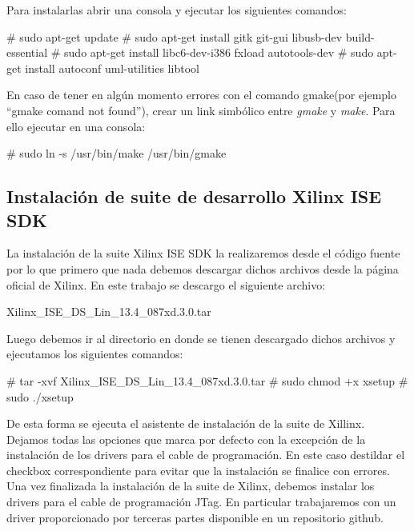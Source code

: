Para instalarlas abrir una consola y ejecutar los siguientes comandos:\\

\begin{bash}
# sudo apt-get update
# sudo apt-get install gitk git-gui libusb-dev build-essential 
# sudo apt-get install libc6-dev-i386 fxload autotools-dev
# sudo apt-get install autoconf uml-utilities libtool
\end{bash}

En caso de tener en algún momento errores con el comando gmake(por ejemplo “gmake comand not found”), crear un link simbólico entre \textit{gmake} y \textit{make}. Para ello ejecutar en una consola:\\

\begin{bash}
# sudo ln -s /usr/bin/make /usr/bin/gmake
\end{bash}

\subsection{Instalación de suite de desarrollo Xilinx ISE SDK}

La instalación de la suite Xilinx ISE SDK la realizaremos desde el código fuente por lo que primero que nada debemos descargar dichos archivos desde la página oficial de Xilinx. En este trabajo se descargo el siguiente archivo:

\begin{center}
Xilinx\_ISE\_DS\_Lin\_13.4\_087xd.3.0.tar
\end{center}

Luego debemos ir al directorio en donde se tienen descargado dichos archivos y ejecutamos los siguientes comandos:

\begin{bash}
# tar -xvf Xilinx_ISE_DS_Lin_13.4_087xd.3.0.tar
# sudo chmod +x xsetup
# sudo ./xsetup
\end{bash}

De esta forma se ejecuta el asistente de instalación de la suite de Xillinx.\\

Dejamos todas las opciones que marca por defecto con la excepción de la instalación de los drivers para el cable de programación. En este caso destildar el checkbox correspondiente para evitar que la instalación se finalice con errores.\\

Una vez finalizada la instalación de la suite de Xilinx, debemos instalar los drivers para el cable de programación JTag. En particular trabajaremos con un driver proporcionado por terceras partes disponible en un repositorio github.\\

